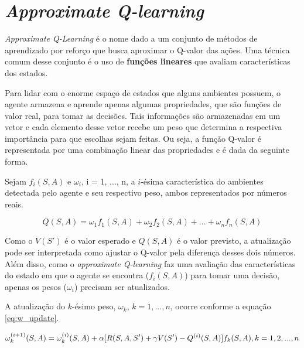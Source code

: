 
\section{\textit{Approximate Q-learning}}
\label{sec:aql}

\textit{Approximate Q-Learning} é o nome dado a um conjunto de métodos de aprendizado por reforço que busca aproximar o Q-valor das ações.
Uma técnica comum desse conjunto é o uso de \textbf{funções lineares} que avaliam características dos estados.

Para lidar com o enorme espaço de estados que alguns ambientes possuem, o agente armazena e aprende apenas algumas propriedades, que são funções de valor real, para tomar as decisões.
Tais informações são armazenadas em um vetor e cada elemento desse vetor recebe um peso que determina a respectiva importância para que escolhas sejam feitas. Ou seja, a função Q-valor é representada por uma combinação linear das propriedades e é dada da seguinte forma.

Sejam $f_{i}(S,A)$ e $\omega_{i}$, i = 1, ..., n, a $i$-ésima característica do ambientes detectada pelo agente e seu respectivo peso, ambos representados por números reais.

\begin{equation} \label{eq:q_lin_comb}
Q(S,A) = \omega_{1}f_{1}(S,A) + \omega_{2}f_{2}(S,A) + ... + \omega_{n}f_{n}(S,A)
\end{equation}

Como o $V(S')$ é o valor esperado e $Q(S,A)$ é o valor previsto, a atualização pode ser interpretada como ajustar o Q-valor pela diferença desses dois números.
Além disso, como o \textit{approximate Q-learning} faz uma avaliação das características do estado em que o agente se encontra ($f_{i}(S,A)$) para tomar uma decisão, apenas os pesos ($\omega_{i}$) precisam ser atualizados.

A atualização do $k$-ésimo peso, $\omega_{k}$, $k = 1, ..., n$, ocorre conforme a equação \ref{eq:w_update}.

\begin{equation} \label{eq:w_update}
\omega_{k}^{(i+1)}(S,A) = \omega_{k}^{(i)}(S,A) + \alpha[R(S,A,S') + \gamma V(S') - Q^{(i)}(S,A)]f_{k}(S,A), \hfill k = 1, 2, ..., n
\end{equation}

